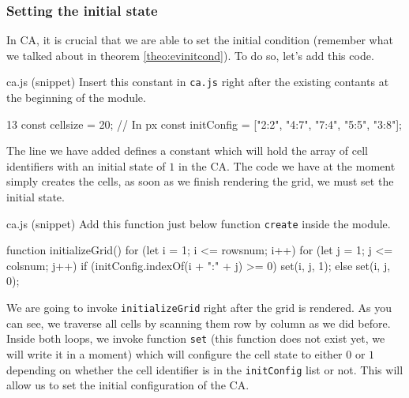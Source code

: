 \subsubsection{Setting the initial state}
In CA, it is crucial that we are able to set the initial condition (remember what we talked about in
theorem \ref{theo:evinitcond}). To do so, let's add this code.

\begin{programcode}{ca.js (snippet)}
Insert this constant in \texttt{ca.js} right after the existing contants at the beginning of the module.
\begin{codeh1}{1}{3}
const cellsize = 20; // In px
const initConfig = ["2:2", "4:7", "7:4", "5:5", "3:8"];
\end{codeh1}
\end{programcode}

The line we have added defines a constant which will hold the array of cell identifiers with an initial state
of $1$ in the CA. The code we have at the moment simply creates the cells, as soon as we finish rendering the grid,
we must set the initial state.

\begin{programcode}{ca.js (snippet)}
Add this function just below function \texttt{create} inside the module.
\begin{code}
function initializeGrid() {
  for (let i = 1; i <= rowsnum; i++) {
    for (let j = 1; j <= colsnum; j++) {
      if (initConfig.indexOf(i + ":" + j) >= 0) {
        set(i, j, 1);
      } else {
        set(i, j, 0);
      }
    }
  }
}
\end{code}
\end{programcode}

We are going to invoke \texttt{initializeGrid} right after the grid is rendered. As you can see, we traverse
all cells by scanning them row by column as we did before. Inside both loops, we invoke function \texttt{set}
(this function does not exist yet, we will write it in a moment) which will configure the cell state to either
$0$ or $1$ depending on whether the cell identifier is in the \texttt{initConfig} list or not. This will allow us
to set the initial configuration of the CA.

